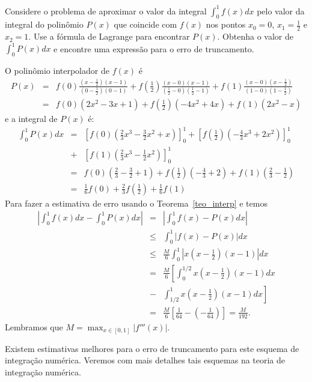 \begin{ex}\label{exemp_simpson}
Considere o problema de aproximar o valor da integral $\int_0^1 f(x)dx$ pelo valor da integral do polinômio $P(x)$ que coincide com $f(x)$ nos pontos $x_0=0$, $x_1=\frac{1}{2}$ e $x_2=1$. Use a fórmula de Lagrange para encontrar $P(x)$. Obtenha o valor de $\int_0^1P(x)dx$ e encontre uma expressão para o erro de truncamento.
\end{ex}
O polinômio interpolador de $f(x)$ é
\begin{eqnarray*}
P(x)&=&f(0)\frac{(x-\frac{1}{2})(x-1)}{(0-\frac{1}{2})(0-1)}+f\left(\frac{1}{2}\right)\frac{(x-0)(x-1)}{(\frac{1}{2}-0)(\frac{1}{2}-1)}+f(1)\frac{(x-0)(x-\frac{1}{2})}{(1-0)(1-\frac{1}{2})}\\
&=&   f(0)(2x^2-3x+1)+f\left(\frac{1}{2}\right)(-4x^2+4x)+f(1)(2x^2-x)
\end{eqnarray*}
e a integral de $P(x)$ é:
\begin{eqnarray*}
\int_0^1 P(x)dx &=& \left[f(0)\left(\frac{2}{3}x^3 - \frac{3}{2}x^2+x\right)\right]_0^1 + \left[f\left(\frac{1}{2}\right)\left(-\frac{4}{3}x^3+2x^2\right)\right]_0^1 \\
&+& \left[f(1)\left(\frac{2}{3}x^3-\frac{1}{2}x^2\right)\right]_0^1\\
&=& f(0)\left(\frac{2}{3}-\frac{3}{2}+1\right)+f\left(\frac{1}{2}\right)\left(-\frac{4}{3}+2\right)+f(1)\left(\frac{2}{3}-\frac{1}{2}\right)\\
&=& \frac{1}{6}f(0)+\frac{2}{3}f\left(\frac{1}{2}\right)+\frac{1}{6}f(1)
\end{eqnarray*}
Para fazer a estimativa de erro usando o Teorema~\ref{teo_interp} e temos
\begin{eqnarray*}
\left|\int_0^1f(x)dx-\int_0^1 P(x)dx\right|&=&\left|\int_0^1f(x)- P(x)dx\right|\\
&\leq&\int_0^1|f(x)- P(x)|dx\\
&\leq& \frac{M}{6}  \int_0^1\left|x\left(x-\frac{1}{2}\right)(x-1)\right|dx\\
&=& \frac{M}{6}  \left[\int_0^{1/2}x\left(x-\frac{1}{2}\right)(x-1)dx\right.\\
&-&\left.\int_{1/2}^1x\left(x-\frac{1}{2}\right)(x-1)dx\right]\\
&=& \frac{M}{6}  \left[\frac{1}{64}-\left(-\frac{1}{64}\right)\right]=\frac{M}{192}.
\end{eqnarray*}
Lembramos que $M=\max_{x\in[0,1]}|f'''(x)|$.

\begin{obs}Existem estimativas melhores para o erro de truncamento para este esquema de integração numérica. Veremos com mais detalhes tais esquemas na teoria de integração numérica.
\end{obs}

